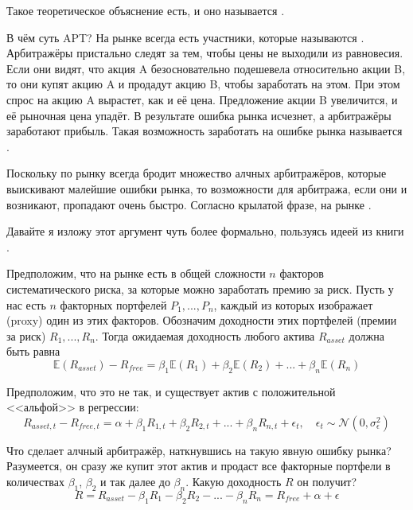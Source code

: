 Такое теоретическое объяснение есть, и оно называется .

В чём суть APT? На рынке всегда есть участники, которые называются 
. Арбитражёры пристально следят за тем, чтобы 
цены не выходили из равновесия. Если они видят, что акция A безосновательно 
подешевела относительно акции B, то они купят акцию A и продадут акцию B, чтобы 
заработать на этом. При этом спрос на акцию A вырастет, как и её цена. 
Предложение акции B увеличится, и её рыночная цена упадёт. В результате ошибка 
рынка исчезнет, а арбитражёры заработают прибыль. Такая возможность заработать 
на ошибке рынка называется .

Поскольку по рынку всегда бродит множество алчных арбитражёров, которые 
выискивают малейшие ошибки рынка, то возможности для арбитража, если они и 
возникают, пропадают очень быстро. Согласно крылатой фразе, на рынке .

Давайте я изложу этот аргумент чуть более формально, пользуясь идеей из книги 
\cite[ch.~9.4]{cochrane2005asset}.

Предположим, что на рынке есть в общей сложности $n$ факторов систематического 
риска, за которые можно заработать премию за риск. Пусть у нас есть $n$ 
факторных портфелей $P_1,...,P_n$, каждый из которых изображает (proxy) один из 
этих факторов. Обозначим доходности этих портфелей (премии за риск)
$R_1,...,R_n$. Тогда ожидаемая доходность любого актива $R_{asset}$ должна быть 
равна
\begin{equation}
\mathbb{E}(R_{asset}) - R_{free} = 
\beta_1\mathbb{E}(R_1) + \beta_2\mathbb{E}(R_2) + ... + \beta_n\mathbb{E}(R_n)
\label{apt_equation}
\end{equation}

Предположим, что это не так, и существует актив с положительной <<альфой>> в 
регрессии:
\begin{equation}
R_{asset,t} - R_{free,t} = \alpha + 
\beta_1R_{1,t} + \beta_2R_{2,t} + ... + \beta_nR_{n,t} + \epsilon_t,
\quad
\epsilon_t \sim \mathcal{N}(0, \sigma_{\epsilon}^2)
\label{apt_regression_example}
\end{equation}

Что сделает алчный арбитражёр, наткнувшись на такую явную ошибку рынка? 
Разумеется, он сразу же купит этот актив и продаст все факторные портфели в 
количествах $\beta_1$, $\beta_2$ и так далее до $\beta_n$. Какую доходность $R$ 
он получит?
\begin{equation*}
R = R_{asset} - \beta_1R_{1} - \beta_2R_{2} - ... - \beta_nR_{n}
= R_{free} + \alpha + \epsilon
\end{equation*}

